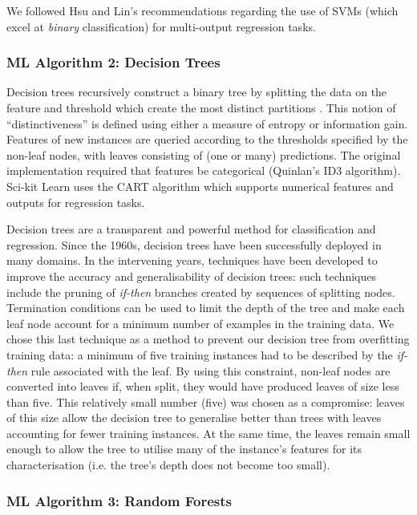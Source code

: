 We followed Hsu and Lin's \cite{MulticlassSVM} recommendations regarding the use of SVMs (which excel at \textit{binary} classification) for  multi-output regression tasks. 

\subsubsection{ML Algorithm 2: Decision Trees}

Decision trees recursively construct a binary tree by  splitting the data on the feature and threshold which create the most distinct partitions \cite{DecisionTrees}.
This notion of ``distinctiveness'' is defined using either a measure of entropy or information gain.
Features of new instances are queried according to the thresholds specified by the non-leaf nodes, with leaves consisting of (one or many) predictions. 
The original implementation required that features be categorical (Quinlan's ID3 algorithm). 
Sci-kit Learn uses the CART \cite{cart} algorithm which supports numerical features and outputs for regression tasks.  

Decision trees are a transparent and powerful method for classification and regression.
Since the 1960s, decision trees have been successfully deployed in many domains. 
In the intervening years, techniques have been developed to improve the accuracy and generalisability of decision trees: such techniques include the pruning of \textit{if-then} branches created by sequences of splitting nodes.
Termination conditions can be used to limit the depth of the tree and make each leaf node account for a minimum number of examples in the training data.
We chose this last technique as a method to prevent our decision tree from overfitting training data: a minimum of five training instances had to be described by the \textit{if-then} rule associated with the leaf.
By using this constraint, non-leaf nodes are converted into leaves if, when split, they would have produced leaves of size less than five. 
This relatively small number (five) was chosen as a compromise: leaves of this size allow the decision tree to generalise better than trees with leaves accounting for fewer training instances. 
At the same time, the leaves remain small enough to allow the tree to utilise many of the instance's features for its characterisation (i.e. the tree's depth does not become too small).   

\subsubsection{ML Algorithm 3: Random Forests}

